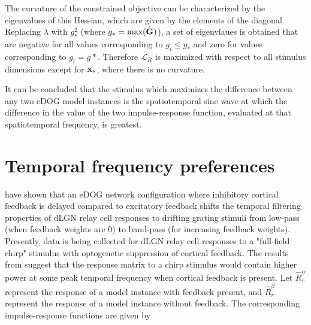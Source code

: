 \documentclass{article}
\newcommand{\Lagr}{\mathcal{L}}
\newcommand{\vect}[1]{\textbf{\textrm{#1}}}
\begin{document}
The curvature of the constrained objective can be characterized by the eigenvalues of this Hessian, which are given by the elements of the diagonal.
Replacing $\lambda$ with $g_*^2$ (where $g_* = \text{max}(\hat{\vect{G}})$), a set of eigenvlaues is obtained that are negative for all values corresponding to $g_i \leq g_*$ and zero for values corresponding to $g_i = g*$.
Therefore $\Lagr_R$ is maximized with respect to all stimulus dimensions except for $\vect{x}_*$, where there is no curvature. \par
\hfill \newline
It can be concluded that the stimulus which maximizes the difference between any two eDOG model instances is the spatiotemporal sine wave at which the difference in the value of the two impulse-response function, evaluated at that spatiotemporal frequency, is greatest.

\begin{comment}
If $c(\vect{x})$ is re-defined as the $L_1$ norm of the stimulus vector (i.e. the plane $c(\vect{x}) = ||\vect{x}||_1 = \sum_n{|x_n|} - 1$), then a linear system is obtained which can be solved algorithmically (e.g. Gauss-Jordan elimination) without losing the main purpose of the constraint.
However, the plane defined by this constraint is not smooth, and therefore the equality constriant $c(\vect{x}) = \sum_n{|x_n|} - 1$ has to be split up into a set of inequality constraints \citep[ch.12, p. 306]{nocedal2006}. \yel{[This needs to be worked out further.]}
\end{comment}


\section{Temporal frequency preferences}
\cite{mobarhan2018} have shown that an eDOG network configuration where inhibitory cortical feedback is delayed compared to excitatory feedback shifts the temporal filtering properties of dLGN relay cell responses to drifting grating stimuli from low-pass (when feedback weights are 0) to band-pass (for increasing feedback weights). 
Presently, data is being collected for dLGN relay cell responses to a "full-field chirp" stimulus with optogenetic suppression of cortical feedback. 
The results from \cite{mobarhan2018} suggest that the response matrix to a chirp stimulus would contain higher power at some peak temporal frequency when cortical feedback is present. 
Let $\hat{R}_r^\alpha$ represent the response of a model instance with feedback present, and $\hat{R}_r^\beta$ represent the response of a model instance without feedback.
The corresponding impulse-response functions are given by
\end{document}

